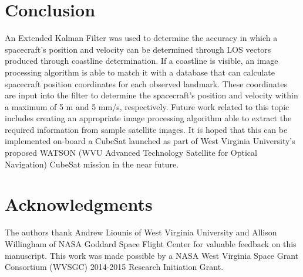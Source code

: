 \documentclass[]{aiaa-tc}%
\begin{document}
\section{Conclusion}
An Extended Kalman Filter was used to determine the accuracy in which a spacecraft's position and velocity can be determined through LOS vectors produced through coastline determination.  If a coastline is visible, an image processing algorithm is able to match it with a database that can calculate spacecraft position coordinates for each observed landmark.  These coordinates are input into the filter to determine the spacecraft's position and velocity within a maximum of 5 m and 5 mm/s, respectively.  Future work related to this topic includes creating an appropriate image processing algorithm able to extract the required information from sample satellite images.  It is hoped that this can be implemented on-board a CubeSat launched as part of West Virginia University's proposed WATSON (WVU Advanced Technology Satellite for Optical Navigation) CubeSat mission in the near future.
%
\section{Acknowledgments}
The authors thank Andrew Liounis of West Virginia University and Allison Willingham of NASA Goddard Space Flight Center for valuable feedback on this manuscript. This work was made possible by a NASA West Virginia Space Grant Consortium (WVSGC) 2014-2015 Research Initiation Grant. 



\end{document}
